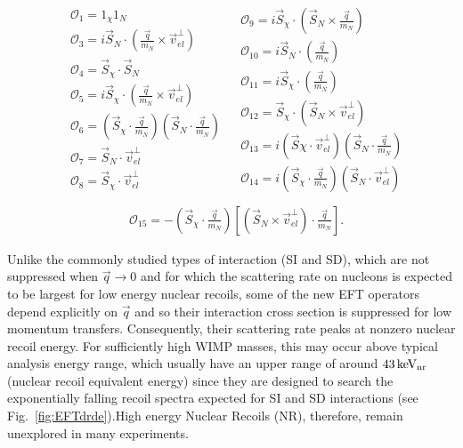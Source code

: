\begingroup
\belowdisplayskip=0pt
\begin{align*}
\begin{split} 
&\mathcal{O}_1 = 1_{\chi} 1_N  \\
&\mathcal{O}_3 = i\vec{S}_N\cdot (\frac{\vec{q}}{m_N}\times\vec{v}_{el}^{\perp}) \\
&\mathcal{O}_4 = \vec{S}_{\chi}\cdot \vec{S}_N \\
&\mathcal{O}_5 = i\vec{S}_{\chi}\cdot (\frac{\vec{q}}{m_N}\times\vec{v}_{el}^{\perp}) \\
&\mathcal{O}_6 = (\vec{S}_{\chi} \cdot \frac{\vec{q}}{m_N})(\vec{S}_N \cdot \frac{\vec{q}}{m_N}) \\
&\mathcal{O}_7 = \vec{S}_N \cdot \vec{v}_{el}^{\perp} \\
&\mathcal{O}_8 = \vec{S}_{\chi} \cdot \vec{v}_{el}^{\perp}  \\
\end{split}
\begin{split}
&\mathcal{O}_9 = i\vec{S}_{\chi} \cdot(\vec{S}_N \times \frac{\vec{q}}{m_N}) \\
&\mathcal{O}_{10} = i\vec{S}_N \cdot (\frac{\vec{q}}{m_N}) \\
&\mathcal{O}_{11} = i\vec{S}_{\chi} \cdot (\frac{\vec{q}}{m_N}) \\
&\mathcal{O}_{12} = \vec{S}_\chi \cdot (\vec{S}_N \times \vec{v}_{el}^{\perp}) \\
&\mathcal{O}_{13} = i(\vec{S}\chi \cdot \vec{v}_{el}^{\perp})(\vec{S}_N \cdot \frac{\vec{q}}{m_N})\\
&\mathcal{O}_{14} = i(\vec{S}_\chi \cdot \frac{\vec{q}}{m_N})(\vec{S}_N \cdot \vec{v}_{el}^{\perp}) \\
\end{split}
\end{align*}
\endgroup
\begingroup
\abovedisplayskip=0pt
\begin{align}
&\mathcal{O}_{15} = -(\vec{S}_\chi \cdot \frac{\vec{q}}{m_N})\left[(\vec{S}_N \times \vec{v}_{el}^{\perp})\cdot \frac{\vec{q}}{m_N}\right].
\label{eq:OpDef}
\end{align}
\endgroup

Unlike the commonly studied types of interaction (SI and SD), which are not suppressed when $\vec{q} \rightarrow 0$ and for which the scattering rate on nucleons is expected to be largest for low energy nuclear recoils, some of the new EFT operators depend explicitly on $\vec{q}$ and so their interaction cross section is suppressed for low momentum transfers. Consequently, their scattering rate peaks at nonzero nuclear recoil energy. For sufficiently high WIMP masses, this may occur above typical analysis energy range, which usually have an upper range of around $ 43\,\mathrm{keV_\mathrm{nr}}$ (nuclear recoil equivalent
energy) since they are designed to search the exponentially falling recoil spectra expected for SI and SD interactions (see Fig.~\ref{fig:EFTdrde}).High energy Nuclear Recoils (NR), therefore, remain unexplored in many experiments.

